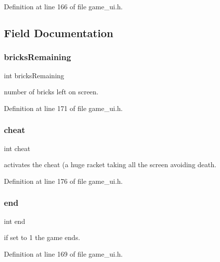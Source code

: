Definition at line 166 of file game\+\_\+ui.\+h.



\subsection{Field Documentation}
\mbox{\label{structgame__t_a4e08ae0a019d63e85e4fb24954774f9d}} 
\subsubsection{\texorpdfstring{bricks\+Remaining}{bricksRemaining}}
{\footnotesize\ttfamily int bricks\+Remaining}

number of bricks left on screen. 

Definition at line 171 of file game\+\_\+ui.\+h.

\mbox{\label{structgame__t_ae80b0201d378d6dfc9ecc3d67e3e364b}} 
\subsubsection{\texorpdfstring{cheat}{cheat}}
{\footnotesize\ttfamily int cheat}

activates the cheat (a huge racket taking all the screen avoiding death. 

Definition at line 176 of file game\+\_\+ui.\+h.

\mbox{\label{structgame__t_abce9f5dc9c83f2639b72024fdee5d388}} 
\subsubsection{\texorpdfstring{end}{end}}
{\footnotesize\ttfamily int end}

if set to 1 the game ends. 

Definition at line 169 of file game\+\_\+ui.\+h.

\mbox{\label{structgame__t_a50491e00170f4adb355806cf91481163}} 
